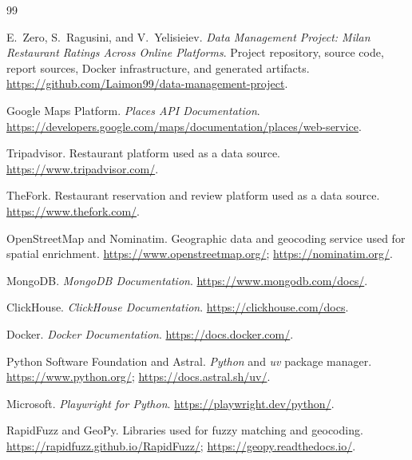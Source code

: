 \documentclass[10pt,a4paper,twocolumn]{article}
\makeatletter
\let\reportsection\section
\let\reportsubsection\subsection
\let\reportsubsubsection\subsubsection
\newcommand{\compactsection}[1]{\reportsubsection{#1}}
\newcommand{\compactsectionstar}[1]{\reportsubsection*{#1}}
\renewcommand{\section}{\@ifstar{\compactsectionstar}{\compactsection}}
\newcommand{\compactsubsection}[1]{\reportsubsubsection{#1}}
\newcommand{\compactsubsectionstar}[1]{\reportsubsubsection*{#1}}
\renewcommand{\subsection}{\@ifstar{\compactsubsectionstar}{\compactsubsection}}
\makeatother
\begin{document}
\begingroup
\let\section\reportsection
{}
{}
\begin{thebibliography}{99}
\small
\setlength{\itemsep}{2pt}

E.~Zero, S.~Ragusini, and V.~Yelisieiev.
\newblock \textit{Data Management Project: Milan Restaurant Ratings Across Online Platforms}.
\newblock Project repository, source code, report sources, Docker infrastructure, and generated artifacts.
\newblock \url{https://github.com/Laimon99/data-management-project}.

Google Maps Platform.
\newblock \textit{Places API Documentation}.
\newblock \url{https://developers.google.com/maps/documentation/places/web-service}.

Tripadvisor.
\newblock Restaurant platform used as a data source.
\newblock \url{https://www.tripadvisor.com/}.

TheFork.
\newblock Restaurant reservation and review platform used as a data source.
\newblock \url{https://www.thefork.com/}.

OpenStreetMap and Nominatim.
\newblock Geographic data and geocoding service used for spatial enrichment.
\newblock \url{https://www.openstreetmap.org/}; \url{https://nominatim.org/}.

MongoDB.
\newblock \textit{MongoDB Documentation}.
\newblock \url{https://www.mongodb.com/docs/}.

ClickHouse.
\newblock \textit{ClickHouse Documentation}.
\newblock \url{https://clickhouse.com/docs}.

Docker.
\newblock \textit{Docker Documentation}.
\newblock \url{https://docs.docker.com/}.

Python Software Foundation and Astral.
\newblock \textit{Python} and \textit{uv} package manager.
\newblock \url{https://www.python.org/}; \url{https://docs.astral.sh/uv/}.

Microsoft.
\newblock \textit{Playwright for Python}.
\newblock \url{https://playwright.dev/python/}.

RapidFuzz and GeoPy.
\newblock Libraries used for fuzzy matching and geocoding.
\newblock \url{https://rapidfuzz.github.io/RapidFuzz/}; \url{https://geopy.readthedocs.io/}.


\end{thebibliography}
\end{document}
